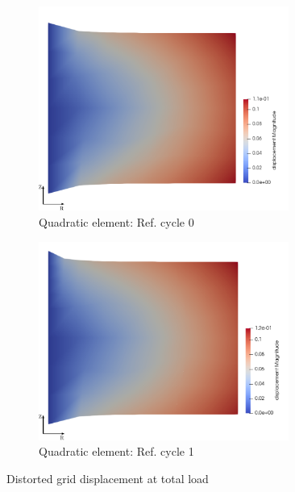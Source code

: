 \documentclass[11pt,a4paper,final]{article}
\begin{document}
\begin{figure}[h]
\begin{subfigure}[b]{0.35\textwidth}
\includegraphics[width=0.9\textwidth]{patch_distort_grid_ref_0_quad.pdf}
\caption{Quadratic element: Ref. cycle 0}
\label{fig:1.2.3}
\end{subfigure}
\begin{subfigure}[b]{0.35\textwidth}
\centering
\includegraphics[width=0.9\textwidth]{patch_distort_grid_ref_1_quad.pdf}
\caption{Quadratic element: Ref. cycle 1}
\label{fig:1.2.4}
\end{subfigure}
\caption{Distorted grid displacement at total load}
\label{fig:1.2}
\end{figure}
\end{document}

